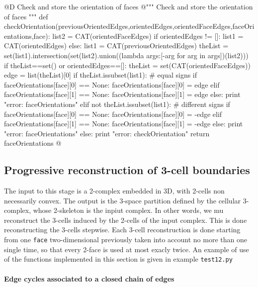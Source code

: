 \documentclass[11pt,oneside]{article}    %
\begin{document}
@D Check and store the orientation of faces
@{""" Check and store the orientation of faces """
def checkOrientation(previousOrientedEdges,orientedEdges,orientedFaceEdges,faceOrientations,face):
    list2 = CAT(orientedFaceEdges)
    if orientedEdges != []:
        list1 = CAT(orientedEdges)
    else: list1 = CAT(previousOrientedEdges)
    theList = set(list1).intersection(set(list2).union((lambda args:[-arg for arg in args])(list2)))
    if theList==set() or orientedEdges==[]:
        theList = set(CAT(orientedFaceEdges))
    edge = list(theList)[0]
    if theList.issubset(list1):  # equal signs
        if faceOrientations[face][0] == None:
            faceOrientations[face][0] = edge
        elif faceOrientations[face][1] == None:
            faceOrientations[face][1] = edge
        else: print "error: faceOrientations"
    elif not theList.issubset(list1): # different signs
        if faceOrientations[face][0] == None: 
            faceOrientations[face][0] = -edge
        elif faceOrientations[face][1] == None:
            faceOrientations[face][1] = -edge
        else: print "error: faceOrientations"
    else: print "error: checkOrientation"
    return faceOrientations
@}


\subsection{Progressive reconstruction of 3-cell boundaries}

The input to this stage is a 2-complex embedded in 3D, with 2-cells non necessarily convex. The output is the 3-space partition defined by the cellular 3-complex, whose 2-skeleton is the inpiut complex. In other words, we mu reconstruct the 3-cells induced by the 2-cells of the input complex. This is done reconstructing the 3-cells stepwise. Each 3-cell reconstruction is done starting from one \texttt{face} two-dimensional previously taken into account no more than one single time, so that every 2-face is used at most exacly twice. An example of use of the functions implemented in this section is given in example \texttt{test12.py}

\paragraph{Edge cycles associated to a closed chain of edges}
\end{document}
